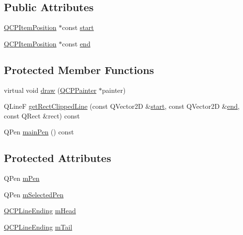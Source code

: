 \subsection*{Public Attributes}
\begin{DoxyCompactItemize}
\item 
\hyperlink{class_q_c_p_item_position}{Q\-C\-P\-Item\-Position} $\ast$const \hyperlink{class_q_c_p_item_line_a602da607a09498b0f152ada1d6851bc5}{start}
\item 
\hyperlink{class_q_c_p_item_position}{Q\-C\-P\-Item\-Position} $\ast$const \hyperlink{class_q_c_p_item_line_a15598864c1c22a2497a1979c4980c4e1}{end}
\end{DoxyCompactItemize}
\subsection*{Protected Member Functions}
\begin{DoxyCompactItemize}
\item 
virtual void \hyperlink{class_q_c_p_item_line_a1fc045dd33919f8006df0692aeb0e84a}{draw} (\hyperlink{class_q_c_p_painter}{Q\-C\-P\-Painter} $\ast$painter)
\item 
Q\-Line\-F \hyperlink{class_q_c_p_item_line_a36e8620019a221ccea4357f0287b81c2}{get\-Rect\-Clipped\-Line} (const Q\-Vector2\-D \&\hyperlink{class_q_c_p_item_line_a602da607a09498b0f152ada1d6851bc5}{start}, const Q\-Vector2\-D \&\hyperlink{class_q_c_p_item_line_a15598864c1c22a2497a1979c4980c4e1}{end}, const Q\-Rect \&rect) const 
\item 
Q\-Pen \hyperlink{class_q_c_p_item_line_a7b5bc4ebacb55774b87c91b308ca7912}{main\-Pen} () const 
\end{DoxyCompactItemize}
\subsection*{Protected Attributes}
\begin{DoxyCompactItemize}
\item 
Q\-Pen \hyperlink{class_q_c_p_item_line_abbb544d5bb927dfe4e81a7f3ca4c65ac}{m\-Pen}
\item 
Q\-Pen \hyperlink{class_q_c_p_item_line_aff858ad6dde3b90024814ca4b116f278}{m\-Selected\-Pen}
\item 
\hyperlink{class_q_c_p_line_ending}{Q\-C\-P\-Line\-Ending} \hyperlink{class_q_c_p_item_line_a51603f28ab7ddb1c1a95ea384791d3ed}{m\-Head}
\item 
\hyperlink{class_q_c_p_line_ending}{Q\-C\-P\-Line\-Ending} \hyperlink{class_q_c_p_item_line_ab8ed61dfe15bbb1cbf9b95eae95e242f}{m\-Tail}
\end{DoxyCompactItemize}
